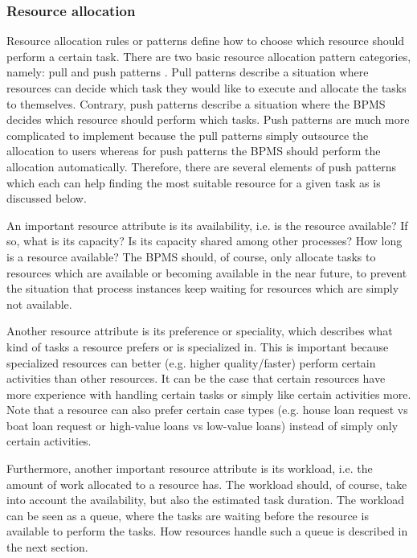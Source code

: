 \subsubsection{Resource allocation}
Resource allocation rules or patterns define how to choose which resource should perform a certain task. There are two basic resource allocation pattern categories, namely: pull and push patterns \cite{hofstede2009modern, aalst2003workflow}. Pull patterns describe a situation where resources can decide which task they would like to execute and allocate the tasks to themselves. Contrary, push patterns describe a situation where the BPMS decides which resource should perform which tasks. Push patterns are much more complicated to implement because the pull patterns simply outsource the allocation to users whereas for push patterns the BPMS should perform the allocation automatically. Therefore, there are several elements of push patterns which each can help finding the most suitable resource for a given task as is discussed below. 

An important resource attribute is its availability, i.e. is the resource available? If so, what is its capacity? Is its capacity shared among other processes? How long is a resource available? The BPMS should, of course, only allocate tasks to resources which are available or becoming available in the near future, to prevent the situation that process instances keep waiting for resources which are simply not available. 

Another resource attribute is its preference or speciality, which describes what kind of tasks a resource prefers or is specialized in. This is important because specialized resources can better (e.g. higher quality/faster) perform certain activities than other resources. It can be the case that certain resources have more experience with handling certain tasks or simply like certain activities more. Note that a resource can also prefer certain case types (e.g. house loan request vs boat loan request or high-value loans vs low-value loans) instead of simply only certain activities.

Furthermore, another important resource attribute is its workload, i.e. the amount of  work allocated to a resource has. The workload should, of course, take into account the availability, but also the estimated task duration. The workload can be seen as a queue, where the tasks are waiting before the resource is available to perform the tasks. How resources handle such a queue is described in the next section. 

